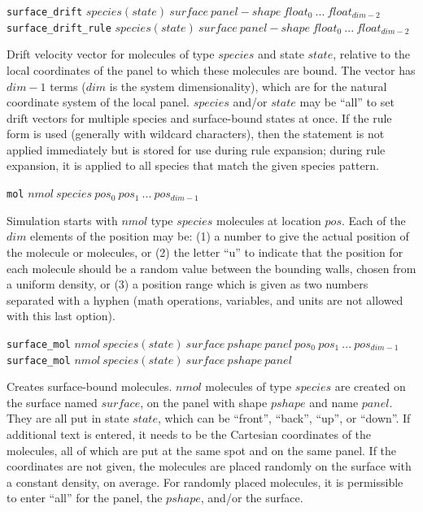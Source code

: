 \documentclass {scrbook}
\newcommand {\ttt} {\texttt}
\begin{document}
\begin{description}
\item{\ttt{surface\_drift} $species(state)\ surface\ panel-shape\ float_0\ ...\ float_{dim-2}$\\
\ttt{surface\_drift\_rule} $species(state)\ surface\ panel-shape\ float_0\ ...\ float_{dim-2}$}

Drift velocity vector for molecules of type $species$ and state $state$, relative to the local coordinates of the panel to which these molecules are bound. The vector has $dim-1$ terms ($dim$ is the system dimensionality), which are for the natural coordinate system of the local panel. $species$ and/or $state$ may be ``all'' to set drift vectors for multiple species and surface-bound states at once. If the rule form is used (generally with wildcard characters), then the statement is not applied immediately but is stored for use during rule expansion; during rule expansion, it is applied to all species that match the given species pattern.

\item{\ttt{mol} $nmol\ species\ pos_0\ pos_1\ ...\ pos_{dim-1}$}

Simulation starts with $nmol$ type $species$ molecules at location $pos$. Each of the $dim$ elements of the position may be: (1) a number to give the actual position of the molecule or molecules, or (2) the letter ``u'' to indicate that the position for each molecule should be a random value between the bounding walls, chosen from a uniform density, or (3) a position range which is given as two numbers separated with a hyphen (math operations, variables, and units are not allowed with this last option).

\item{\ttt{surface\_mol} $nmol\ species(state)\ surface\ pshape\ panel\ pos_0\ pos_1\ ...\ pos_{dim-1}$\\
\ttt{surface\_mol} $nmol\ species(state)\ surface\ pshape\ panel$}

Creates surface-bound molecules. $nmol$ molecules of type $species$ are created on the surface named $surface$, on the panel with shape $pshape$ and name $panel$. They are all put in state $state$, which can be ``front'', ``back'', ``up'', or ``down''. If additional text is entered, it needs to be the Cartesian coordinates of the molecules, all of which are put at the same spot and on the same panel. If the coordinates are not given, the molecules are placed randomly on the surface with a constant density, on average. For randomly placed molecules, it is permissible to enter ``all'' for the panel, the $pshape$, and/or the surface.


\end{description}
\end{document}
